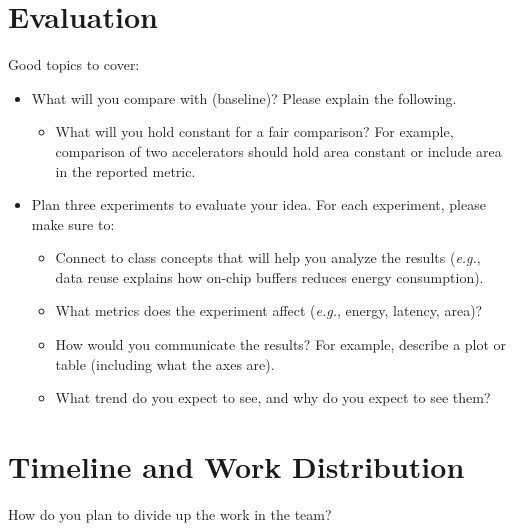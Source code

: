 \documentclass[conference,onecolumn]{IEEEtran}
\begin{document}
\section{Evaluation}
Good topics to cover:
\begin{itemize}
    \item What will you compare with (baseline)? Please explain the following.
    \begin{itemize}
        \item What will you hold constant for a fair comparison? For example, comparison of two accelerators should hold area constant or include area in the reported metric.
    \end{itemize}
    \item Plan three experiments to evaluate your idea. For each experiment, please make sure to:
    \begin{itemize}
        \item Connect to class concepts that will help you analyze the results (\emph{e.g.}, data reuse explains how on-chip buffers reduces energy consumption).
        \item What metrics does the experiment affect (\emph{e.g.}, energy, latency, area)?
        \item How would you communicate the results? For example, describe a plot or table (including what the axes are).
        \item What trend do you expect to see, and why do you expect to see them?
    \end{itemize}
\end{itemize}


\section{Timeline and Work Distribution}
How do you plan to divide up the work in the team?
\end{document}
